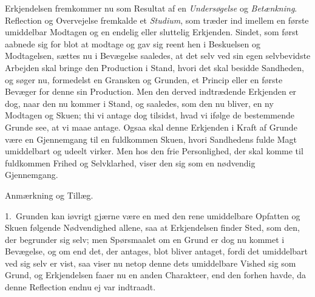 \documentclass[12pt,a4paper]{book}
\newcommand{\apage}[1]{\marginnote{\footnotesize\textit{[#1]}}}
\begin{document}
Erkjendelsen fremkommer nu som Resultat af en \emph{Undersøgelse} og \emph{Betænkning}.
Reflection og Overvejelse fremkalde et \emph{Studium}, som træder ind imellem en
første umiddelbar Modtagen og en endelig eller sluttelig Erkjenden. Sindet, som
først aabnede sig for blot at modtage og gav sig reent hen i Beskuelsen og
Modtagelsen, sættes nu i Bevægelse saaledes, at det selv ved sin egen
selvbevidste Arbejden skal bringe den Production i Stand, hvori det skal besidde
Sandheden, og søger nu, formedelst en Gransken og Grunden, et Princip eller en
første Bevæger for denne sin Production. Men den derved indtrædende Erkjenden er
dog, naar den nu kommer i Stand, og saaledes, som den nu bliver, en ny Modtagen
og Skuen; thi vi antage dog tilsidst, hvad vi ifølge de bestemmende Grunde see,
at vi maae antage. Ogsaa skal denne Erkjenden i Kraft af Grunde være en
Gjennemgang til en fuldkommen Skuen, hvori Sandhedens fulde Magt umiddelbart og
udeelt virker. \apage{38} Men hos den frie Personlighed, der skal komme til fuldkommen
Frihed og Selvklarhed, viser den sig som en nødvendig Gjennemgang.

\begin{center}Anmærkning og Tillæg.\end{center}

1.~Grunden kan iøvrigt gjærne være en med den rene umiddelbare Opfatten og Skuen
følgende Nødvendighed allene, saa at Erkjendelsen finder Sted, som den, der
begrunder sig selv; men Spørsmaalet om en Grund er dog nu kommet i Bevægelse, og
om end det, der antages, blot bliver antaget, fordi det umiddelbart ved sig selv
er vist, saa viser nu netop denne dets umiddelbare Vished sig som Grund, og
Erkjendelsen faaer nu en anden Charakteer, end den forhen havde, da denne
Reflection endnu ej var indtraadt.
\end{document}
